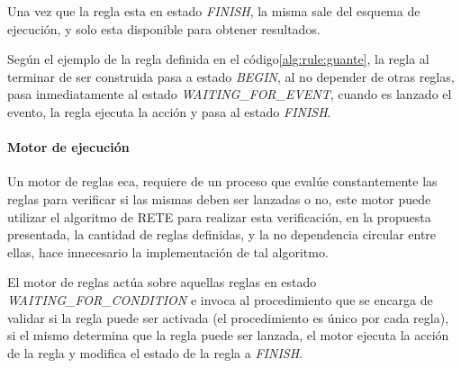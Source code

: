 Una vez que la regla esta en estado \emph{FINISH}, la misma sale del esquema de
ejecución, y solo esta disponible para obtener resultados.

Según el ejemplo de la regla definida en el código\ref{alg:rule:guante}, la
regla al terminar de ser construida pasa a estado \emph{BEGIN}, al no depender
de otras reglas, pasa inmediatamente al estado \emph{WAITING\_FOR\_EVENT},
cuando es lanzado el evento, la regla ejecuta la acción y pasa al estado
\emph{FINISH}.

\paragraph{Motor de ejecución}

Un motor de reglas \gls{eca}, requiere de un proceso que evalúe constantemente
las reglas para verificar si las mismas deben ser lanzadas o
no\cite{bailey2004event,galton2002two}, este motor puede utilizar el algoritmo
de RETE\cite{de2001eca} para realizar esta verificación, en la propuesta
presentada, la cantidad de reglas definidas, y la no dependencia circular entre
ellas, hace innecesario la implementación de tal algoritmo\cite{de2001eca}. 

El motor de reglas actúa sobre aquellas reglas en estado
\emph{WAITING\_FOR\_CONDITION} e invoca al procedimiento que se encarga de
validar si la regla puede ser activada (el procedimiento es único por cada
regla), si el mismo determina que la regla puede ser lanzada, el motor ejecuta
la acción de la regla y modifica el estado de la regla a \emph{FINISH}.
